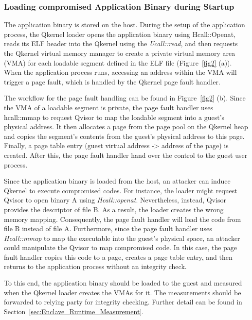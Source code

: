 \subsubsection{Loading compromised Application Binary during Startup}
\label{sec:app_binary_loading}
The application binary is stored on the host. During the setup of the application process, the Qkernel loader opens the application binary using Hcall::Openat, reads its ELF header into the Qkernel using the \emph{Ucall::read}, and then requests the Qkernel virtual memory manager to create a private virtual 
memory area (\acrshort{VMA}) for each loadable segment defined in the ELF file (Figure~\ref{fig2} (a)). When the application process runs, accessing an address within the \acrshort{VMA} will trigger a page fault, which is handled by the Qkernel page fault handler.
 
The workflow for the page fault handling can be found in Figure~\ref{fig2} (b). Since the \acrshort{VMA} of a loadable segment is private, the page fault handler uses hcall::mmap to request Qvisor to map the loadable segment into a guest's physical address. It then allocates a page from the page pool on the Qkernel heap and copies the 
segment's contents from the guest's physical address to this page. Finally, a page table entry (guest virtual address -> address of the page) is created. After this, the page fault handler hand over the control to the guest user process.
 
Since the application binary is loaded from the host,  an attacker can induce Qkernel to execute compromised codes. For instance, the loader might request Qvisor to open binary A using \emph{Hcall::openat}. Nevertheless, instead, Qvisor provides the descriptor of file B. As a result, the loader creates the 
wrong memory mapping. Consequently, the page fault handler will load the code from file B instead of file A. Furthermore, since the page fault handler uses \emph{Hcall::mmap} to map the executable into the guest's physical space, an attacker could manipulate the Qvisor to map compromised code. In this case, 
the page fault handler copies this code to a page, creates a page table entry, and then returns to the application process without an integrity check.  
 
To this end, the application binary should be loaded to the guest and measured when the Qkernel loader creates the \acrshort{VMA}s for it. The measurements should be forwarded to relying party for integrity checking. Further detail can be found in Section~\ref{sec:Enclave_Runtime_Measurement}. 

